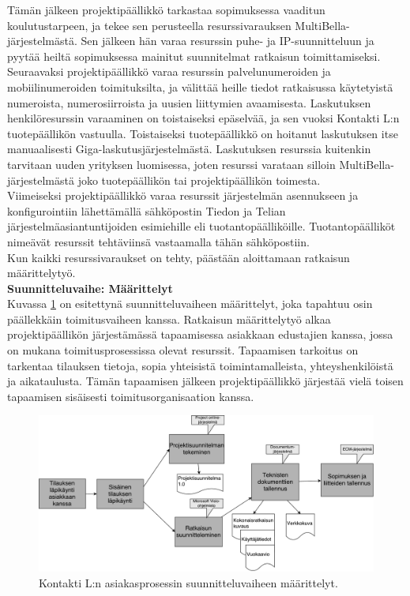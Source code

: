 \documentclass[finnish,12pt,a4paper,pdftex]{article}
\begin{document}
\noindent Tämän jälkeen projektipäällikkö tarkastaa sopimuksessa vaaditun koulutustarpeen, ja tekee sen perusteella resurssivarauksen MultiBella-järjestelmästä. Sen jälkeen hän varaa resurssin puhe- ja IP-suunnitteluun ja pyytää heiltä sopimuksessa mainitut suunnitelmat ratkaisun toimittamiseksi.\\

\noindent Seuraavaksi projektipäällikkö varaa resurssin palvelunumeroiden ja mobiilinumeroiden toimituksilta, ja välittää heille tiedot ratkaisussa käytetyistä numeroista, numerosiirroista ja uusien liittymien avaamisesta. Laskutuksen henkilöresurssin varaaminen on toistaiseksi epäselvää, ja sen vuoksi Kontakti L:n tuotepäällikön vastuulla. Toistaiseksi tuotepäällikkö on hoitanut laskutuksen itse manuaalisesti Giga-laskutusjärjestelmästä. Laskutuksen resurssia kuitenkin tarvitaan uuden yrityksen luomisessa, joten resurssi varataan silloin MultiBella-järjestelmästä joko tuotepäällikön tai projektipäällikön toimesta.\\

\noindent Viimeiseksi projektipäällikkö varaa resurssit järjestelmän asennukseen ja konfigurointiin lähettämällä sähköpostin Tiedon ja Telian järjestelmäasiantuntijoiden esimiehille eli tuotantopäälliköille. Tuotantopäälliköt nimeävät resurssit tehtäviinsä vastaamalla tähän sähköpostiin.\\

\noindent Kun kaikki resurssivaraukset on tehty, päästään aloittamaan ratkaisun määrittelytyö.\\

\textbf{Suunnitteluvaihe: Määrittelyt}\\

\noindent Kuvassa \ref{fig:maarittely} on esitettynä suunnitteluvaiheen määrittelyt, joka tapahtuu osin päällekkäin toimitusvaiheen kanssa. Ratkaisun määrittelytyö alkaa projektipäällikön järjestämässä tapaamisessa asiakkaan edustajien kanssa, jossa on mukana toimitusprosessissa olevat resurssit. Tapaamisen tarkoitus on tarkentaa tilauksen tietoja, sopia yhteisistä toimintamalleista, yhteyshenkilöistä ja aikataulusta. Tämän tapaamisen jälkeen projektipäällikkö järjestää vielä toisen tapaamisen sisäisesti toimitusorganisaation kanssa.\\

\begin{figure}[!h]
    \centering
    \includegraphics[scale=0.25]{images/maarittely.pdf}
    \caption{Kontakti L:n asiakasprosessin suunnitteluvaiheen määrittelyt.}
    \label{fig:maarittely}
\end{figure}
\end{document}
